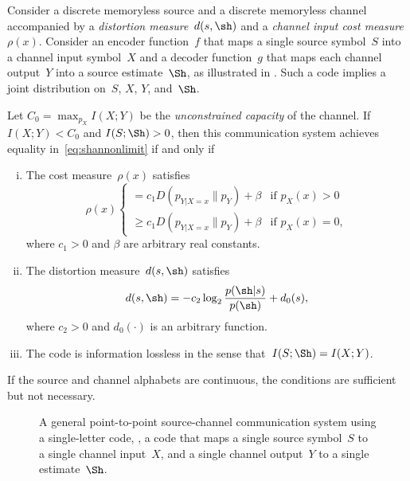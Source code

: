 \begin{theorem}
  \label{thm:tcntcbwmatch}
  Consider a discrete memoryless source and a discrete memoryless channel
  accompanied by a \emph{distortion measure}~$d(s,\sh)$ and a \emph{channel
  input cost measure} $\rho(x)$. Consider an encoder function~$f$ that maps a
  single source symbol~$S$ into a channel input symbol~$X$ and a decoder
  function~$g$ that maps each channel output~$Y$ into a source estimate~$\Sh$,
  as illustrated in .  Such a code implies a joint
  distribution on~$S$, $X$, $Y$, and~$\Sh$.

  Let $C_0 = \max_{p_X} I(X;Y)$ be the \emph{unconstrained capacity} of the
  channel.  If $I(X;Y) < C_0$ and $I(S;\Sh) > 0$, then this communication system
  achieves equality in~\eqref{eq:shannonlimit} if and only if
  \begin{enumerate}[(i)]
    \item The cost measure~$\rho(x)$ satisfies
      \begin{equation}
        \label{eq:optcost}
        \rho(x)
        \begin{cases}
          = c_1 D(p_{Y|X=x} \| p_Y) + \beta & \text{if $p_X(x) > 0$} \\
          \ge c_1 D(p_{Y|X=x} \| p_Y) + \beta & \text{if $p_X(x) = 0$},
        \end{cases}
      \end{equation}
      where $c_1 > 0$ and $\beta$ are arbitrary real constants.

    \item The distortion measure~$d(s,\sh)$ satisfies
      \begin{equation}
        \label{eq:optdist}
        d(s,\sh) = - c_2 \log_2 \frac{p(\sh|s)}{p(\sh)} + d_0(s),
      \end{equation}
      where $c_2 > 0$ and $d_0(\cdot)$ is an arbitrary function.

    \item The code is information lossless in the sense that~$I(S;\Sh) =
      I(X;Y)$.
  \end{enumerate}
  If the source and channel alphabets are continuous, the conditions are
  sufficient but not necessary.
\end{theorem}

\begin{figure}
  \begin{center}
    
  \end{center}
  \caption{A general point-to-point source-channel communication system using a
  single-letter code, \ie, a code that maps a single source symbol~$S$ to a
  single channel input~$X$, and a single channel output~$Y$ to a single
  estimate~$\Sh$.}
  \label{fig:scgensingle}
\end{figure}

